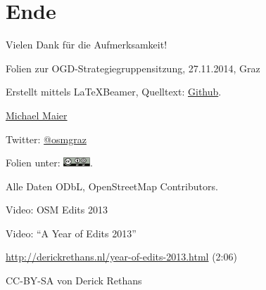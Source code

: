 \documentclass{beamer}
\begin{document}
\section{Ende}

\begin{frame}{Vielen Dank für die Aufmerksamkeit!}

  Folien zur OGD-Strategiegruppensitzung, 27.11.2014, Graz
\vspace{1cm}

Erstellt mittels \LaTeX Beamer, Quelltext: \href{https://github.com/species/vortrag-osm-ogdgraz}{Github}.
\vspace{1cm}

\href{mailto:michael.maier@student.tugraz.at}{Michael Maier}

Twitter: \href{https://twitter.com/osmgraz}{@osmgraz}
\vspace{1cm}

Folien unter: \includegraphics[width=1cm]{cc-by-sa.pdf}. 

Alle Daten ODbL, OpenStreetMap Contributors.

\end{frame}

\begin{frame}{Video: OSM Edits 2013}

  Video: "`A Year of Edits 2013"'

  \vspace{1cm}

\url{http://derickrethans.nl/year-of-edits-2013.html}  (2:06)

\vspace{1cm}

CC-BY-SA von Derick Rethans

\end{frame}
\end{document}
